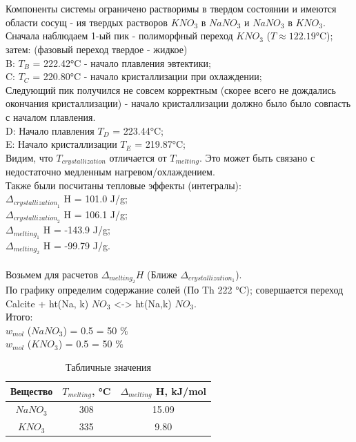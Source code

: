 \documentclass[a4paper,12pt]{article} %
\begin{document}
\quad \\
\\ Компоненты системы ограничено растворимы в твердом состоянии и имеются области сосущ - ия твердых растворов ${KNO}_3$ в ${NaNO}_3$ и ${NaNO}_3$ в ${KNO}_3$.
\\ Сначала наблюдаем 1-ый пик - полиморфный переход ${KNO}_3$ ($ T \approx 122.19 $°C); затем: (фазовый переход твердое - жидкое)
\\ B: $T_B$ = 222.42°C - начало плавления эвтектики;
\\C: $T_C$ = 220.80°C - начало кристаллизации при охлаждении;
\\Следующий пик получился не совсем корректным (скорее всего не дождались окончания кристаллизации) - начало кристаллизации должно было было совпасть с началом плавления.
\\D: Начало плавления $T_D$ = 223.44°C;
\\E: Начало кристаллизации $T_E$  = 219.87°C;
\\Видим, что $T_{crystallization}$ отличается от $T_{melting}$. Это может быть связано с недостаточно медленным нагревом/охлаждением. 
\\ Также были посчитаны тепловые эффекты (интегралы):
\\ $\Delta_{{crystallization}_1}$ H = 101.0 J/g;
\\ $\Delta_{{crystallization}_2}$ H = 106.1 J/g;
\\ $\Delta_{{melting}_1}$ H = -143.9 J/g;
\\ $\Delta_{{melting}_2}$ H = -99.79 J/g.
\quad \\ 
\\ Возьмем для расчетов $\Delta_{melting_2}H$ (Ближе $\Delta_{crystallization_1}$).
\\По графику определим содержание солей (По Th 222 °C);
совершается переход Calcite + ht(Na, k) ${NO}_3$ <-> ht(Na,k) ${NO}_3$. 
\\ Итого:
\\ $w_{mol}$ (${NaNO}_3$) = 0.5 = 50 $\%$
\\ $w_{mol}$ (${KNO}_3$) = 0.5 = 50 $\%$
\\\begin{table}[H]
    \begin{center}
        \begin{tabular}{|c|c|c|}
        \hline
           Вещество & $T_{melting}$, °C & $\Delta_{{melting}}$ H, kJ/mol \\\hline
          ${NaNO}_3$ & 308 & 15.09 \\\hline
          ${KNO}_3$ & 335 & 9.80 \\\hline
        \end{tabular}
        \caption{Табличные значения}
    \end{center}
\end{table}
\end{document}
